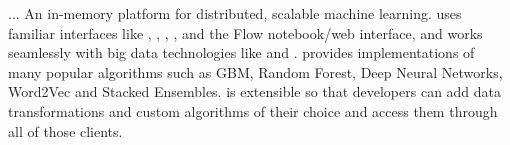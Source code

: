 ... An in-memory platform for distributed, scalable machine learning. 
uses familiar interfaces like \R, , , ,  and the Flow
notebook/web interface, and works seamlessly with big data technologies
like  and .  provides implementations of many popular
algorithms such as GBM, Random Forest, Deep Neural Networks, Word2Vec
and Stacked Ensembles.  is extensible so that developers can add data
transformations and custom algorithms of their choice and access them
through all of those clients.
